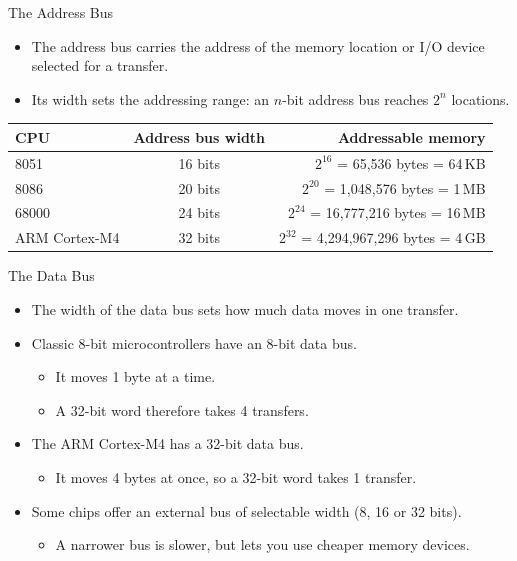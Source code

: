 \documentclass[9pt,aspectratio=169,xcolor=table]{beamer}
\newcommand{\striped}{\rowcolors{1}{white}{stripe}}
\begin{document}
\begin{frame}{The Address Bus}
    \begin{itemize}\itemsep4pt
        \item The address bus carries the address of the memory location
              or I/O device selected for a transfer.
        \item Its \alert{width} sets the addressing range: an $n$-bit
              address bus reaches $2^n$ locations.
    \end{itemize}

    \vspace{3mm}
    \begin{center}
    {\small
    \striped
    \begin{tabular}{@{}l c r@{}}
        \toprule
        \textbf{CPU} & \textbf{Address bus width} & \textbf{Addressable memory} \\
        \midrule
        8051   & 16 bits & $2^{16}$ = 65,536 bytes = 64\,KB \\
        8086   & 20 bits & $2^{20}$ = 1,048,576 bytes = 1\,MB \\
        68000  & 24 bits & $2^{24}$ = 16,777,216 bytes = 16\,MB \\
        ARM Cortex-M4 & 32 bits & $2^{32}$ = 4,294,967,296 bytes = \alert{4\,GB} \\
        \bottomrule
    \end{tabular}}
    \end{center}
\end{frame}

\begin{frame}{The Data Bus}
    \begin{itemize}\itemsep4pt
        \item The width of the data bus sets how much data moves in
              \alert{one transfer}.
        \item Classic 8-bit microcontrollers have an 8-bit data bus.
            \begin{itemize}
                \item It moves 1 byte at a time.
                \item A 32-bit word therefore takes 4 transfers.
            \end{itemize}
        \item The ARM Cortex-M4 has a 32-bit data bus.
            \begin{itemize}
                \item It moves 4 bytes at once, so a 32-bit word takes 1 transfer.
            \end{itemize}
        \item Some chips offer an external bus of selectable width
              (8, 16 or 32 bits).
            \begin{itemize}
                \item A narrower bus is slower, but lets you use cheaper memory devices.
            \end{itemize}
    \end{itemize}
\end{frame}
\end{document}
